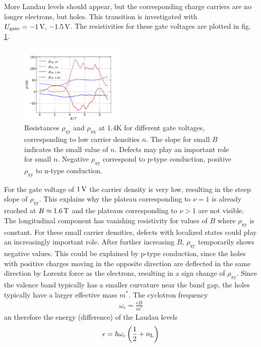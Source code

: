 More Landau levels should appear, but the corresponding charge carriers are no longer electrons, but holes.
This transition is investigated with $U_\text{gate}=-1 \,\text V,\,-1.5 \,\text V$.
The resistivities for these gate voltages are plotted in fig. \ref{fig:kaputteKurvenGateV}.
\begin{figure}[h]
    \centering
    \includegraphics[width=0.45\textwidth]{../Images/kaputteKurvenGateV.png}
    \caption{
        Resistances $\rho_\text{xy}$ and $\rho_\text{xx}$ at $1.4\text{K}$ for different gate voltages, corresponding to low carrier densities $n$.  
        The slope for small $B$ indicates the small value of $n$.
        Defects may play an important role for small $n$.
        Negative $\rho_\text{xy}$ correspond to p-type conduction, positive $\rho_\text{xy}$ to n-type conduction.}
    \label{fig:kaputteKurvenGateV}
\end{figure}
For the gate voltage of $1\,\text V$ the carrier density is very low, resulting in the steep slope of $\rho_\text{xy}$.
This explains why the plateau corresponding to $\nu = 1$ is already reached at $B\approx1.6 \,\text T$ and the plateaus corresponding to $\nu > 1$ are not visible.
The longitudinal component has vanishing resistivity for values of $B$ where $\rho_\text{xy}$ is constant.
For these small carrier densities, defects with localized states could play an increasingly important role.
After further increasing $B$, $\rho_\text{xy}$ temporarily shows negative values.
This could be explained by p-type conduction, 
since the holes with positive charges moving in the opposite direction are deflected in the same direction by Lorentz force as the electrons, resulting in a sign change of $\rho_\text{xy}$.
Since the valence band typically has a smaller curvature near the band gap, the holes typically have a larger effective mass $m^\ast$.
The cyclotron frequency
\begin{align}
    \omega_c = \frac{eB}{m^\ast}    
\end{align}
an therefore the energy (difference) of the Laudau levels
\begin{align}
    \epsilon = \hbar \omega_c \left(\frac{1}{2} + n_\text L \right)
\end{align}
